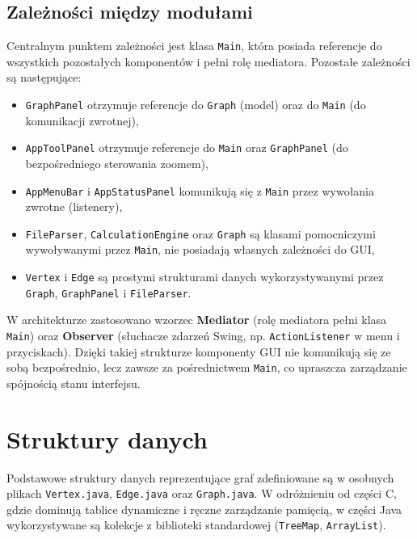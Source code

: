 \documentclass[a4paper, 11pt]{article}
\begin{document}
\subsection{Zależności między modułami}

Centralnym punktem zależności jest klasa \texttt{Main}, która posiada
referencje do wszystkich pozostałych komponentów i pełni rolę mediatora.
Pozostałe zależności są następujące:

\begin{itemize}
  \item \texttt{GraphPanel} otrzymuje referencje do \texttt{Graph} (model)
    oraz do \texttt{Main} (do komunikacji zwrotnej),
  \item \texttt{AppToolPanel} otrzymuje referencje do \texttt{Main}
    oraz \texttt{GraphPanel} (do bezpośredniego sterowania zoomem),
  \item \texttt{AppMenuBar} i \texttt{AppStatusPanel} komunikują się
    z \texttt{Main} przez wywołania zwrotne (listenery),
  \item \texttt{FileParser}, \texttt{CalculationEngine} oraz
    \texttt{Graph} są klasami pomocniczymi wywoływanymi przez \texttt{Main},
    nie posiadają własnych zależności do GUI,
  \item \texttt{Vertex} i \texttt{Edge} są prostymi strukturami danych
    wykorzystywanymi przez \texttt{Graph}, \texttt{GraphPanel}
    i \texttt{FileParser}.
\end{itemize}

W architekturze zastosowano wzorzec \textbf{Mediator} (rolę mediatora
pełni klasa \texttt{Main}) oraz \textbf{Observer} (słuchacze zdarzeń
Swing, np. \texttt{ActionListener} w menu i przyciskach). Dzięki takiej
strukturze komponenty GUI nie komunikują się ze sobą bezpośrednio,
lecz zawsze za pośrednictwem \texttt{Main}, co upraszcza zarządzanie
spójnością stanu interfejsu.

\section{Struktury danych}

Podstawowe struktury danych reprezentujące graf zdefiniowane są
w osobnych plikach \texttt{Vertex.java}, \texttt{Edge.java}
oraz \texttt{Graph.java}. W odróżnieniu od części C, gdzie dominują
tablice dynamiczne i ręczne zarządzanie pamięcią, w części Java
wykorzystywane są kolekcje z biblioteki standardowej
(\texttt{TreeMap}, \texttt{ArrayList}).
\end{document}
